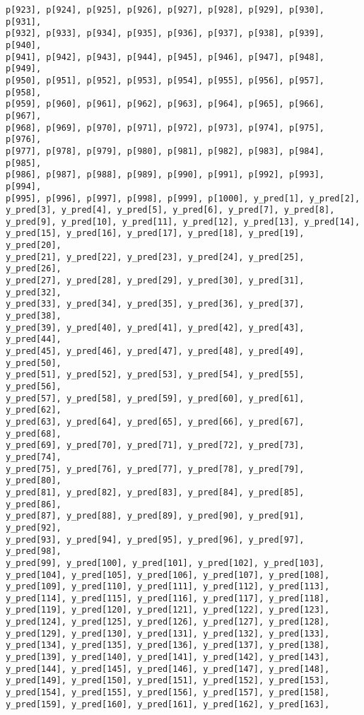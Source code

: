 \documentclass[
  letterpaper,
  DIV=11,
  numbers=noendperiod]{scrartcl}
\begin{document}
\begin{verbatim}
p[923], p[924], p[925], p[926], p[927], p[928], p[929], p[930], p[931],
p[932], p[933], p[934], p[935], p[936], p[937], p[938], p[939], p[940],
p[941], p[942], p[943], p[944], p[945], p[946], p[947], p[948], p[949],
p[950], p[951], p[952], p[953], p[954], p[955], p[956], p[957], p[958],
p[959], p[960], p[961], p[962], p[963], p[964], p[965], p[966], p[967],
p[968], p[969], p[970], p[971], p[972], p[973], p[974], p[975], p[976],
p[977], p[978], p[979], p[980], p[981], p[982], p[983], p[984], p[985],
p[986], p[987], p[988], p[989], p[990], p[991], p[992], p[993], p[994],
p[995], p[996], p[997], p[998], p[999], p[1000], y_pred[1], y_pred[2],
y_pred[3], y_pred[4], y_pred[5], y_pred[6], y_pred[7], y_pred[8],
y_pred[9], y_pred[10], y_pred[11], y_pred[12], y_pred[13], y_pred[14],
y_pred[15], y_pred[16], y_pred[17], y_pred[18], y_pred[19], y_pred[20],
y_pred[21], y_pred[22], y_pred[23], y_pred[24], y_pred[25], y_pred[26],
y_pred[27], y_pred[28], y_pred[29], y_pred[30], y_pred[31], y_pred[32],
y_pred[33], y_pred[34], y_pred[35], y_pred[36], y_pred[37], y_pred[38],
y_pred[39], y_pred[40], y_pred[41], y_pred[42], y_pred[43], y_pred[44],
y_pred[45], y_pred[46], y_pred[47], y_pred[48], y_pred[49], y_pred[50],
y_pred[51], y_pred[52], y_pred[53], y_pred[54], y_pred[55], y_pred[56],
y_pred[57], y_pred[58], y_pred[59], y_pred[60], y_pred[61], y_pred[62],
y_pred[63], y_pred[64], y_pred[65], y_pred[66], y_pred[67], y_pred[68],
y_pred[69], y_pred[70], y_pred[71], y_pred[72], y_pred[73], y_pred[74],
y_pred[75], y_pred[76], y_pred[77], y_pred[78], y_pred[79], y_pred[80],
y_pred[81], y_pred[82], y_pred[83], y_pred[84], y_pred[85], y_pred[86],
y_pred[87], y_pred[88], y_pred[89], y_pred[90], y_pred[91], y_pred[92],
y_pred[93], y_pred[94], y_pred[95], y_pred[96], y_pred[97], y_pred[98],
y_pred[99], y_pred[100], y_pred[101], y_pred[102], y_pred[103],
y_pred[104], y_pred[105], y_pred[106], y_pred[107], y_pred[108],
y_pred[109], y_pred[110], y_pred[111], y_pred[112], y_pred[113],
y_pred[114], y_pred[115], y_pred[116], y_pred[117], y_pred[118],
y_pred[119], y_pred[120], y_pred[121], y_pred[122], y_pred[123],
y_pred[124], y_pred[125], y_pred[126], y_pred[127], y_pred[128],
y_pred[129], y_pred[130], y_pred[131], y_pred[132], y_pred[133],
y_pred[134], y_pred[135], y_pred[136], y_pred[137], y_pred[138],
y_pred[139], y_pred[140], y_pred[141], y_pred[142], y_pred[143],
y_pred[144], y_pred[145], y_pred[146], y_pred[147], y_pred[148],
y_pred[149], y_pred[150], y_pred[151], y_pred[152], y_pred[153],
y_pred[154], y_pred[155], y_pred[156], y_pred[157], y_pred[158],
y_pred[159], y_pred[160], y_pred[161], y_pred[162], y_pred[163],

\end{verbatim}
\end{document}
